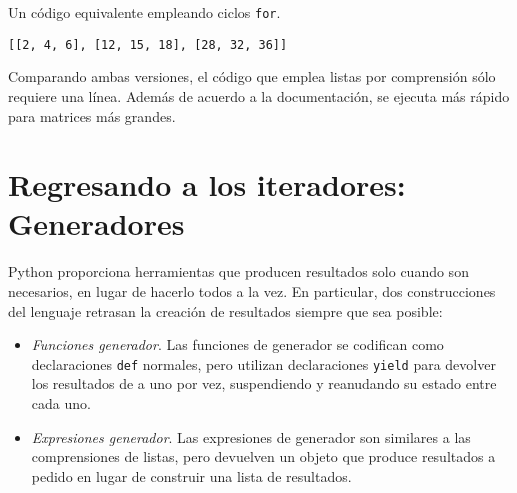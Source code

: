 \begin{code} Un código equivalente empleando ciclos \texttt{for}.

\begin{Shaded}
\begin{Highlighting}[]
\OperatorTok{=}\NormalTok{ []}
 \NormalTok{(}
\OperatorTok{=}\NormalTok{ []}
     \NormalTok{(}
\OperatorTok{*}
    
\end{Highlighting}
\end{Shaded}

\begin{verbatim}
[[2, 4, 6], [12, 15, 18], [28, 32, 36]]
\end{verbatim}
\end{code}

Comparando ambas versiones, el código que emplea listas por comprensión
sólo requiere una línea. Además de acuerdo a la documentación, se
ejecuta más rápido para matrices más grandes.

\section{Regresando a los iteradores: Generadores}

Python proporciona herramientas que producen resultados solo cuando son
necesarios, en lugar de hacerlo todos a la vez. En particular, dos
construcciones del lenguaje retrasan la creación de resultados siempre
que sea posible:

\begin{itemize}

\item
  \emph{Funciones generador}. Las funciones de generador se codifican
  como declaraciones \texttt{def} normales, pero utilizan declaraciones
  \texttt{yield} para devolver los resultados de a uno por vez,
  suspendiendo y reanudando su estado entre cada uno.
\item
  \emph{Expresiones generador}. Las expresiones de generador son
  similares a las comprensiones de listas, pero devuelven un objeto que
  produce resultados a pedido en lugar de construir una lista de
  resultados.
\end{itemize}

